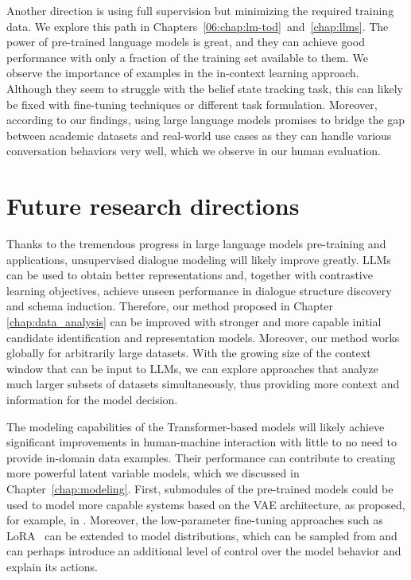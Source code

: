 Another direction is using full supervision but minimizing the required training data.
We explore this path in Chapters~\ref{06:chap:lm-tod}~and~\ref{chap:llms}.
The power of pre-trained language models is great, and they can achieve good performance with only a fraction of the training set available to them.
We observe the importance of examples in the in-context learning approach.
Although they seem to struggle with the belief state tracking task, this can likely be fixed with fine-tuning techniques or different task formulation.
Moreover, according to our findings, using large language models promises to bridge the gap between academic datasets and real-world use cases as they can handle various conversation behaviors very well, which we observe in our human evaluation.

\section{Future research directions}
Thanks to the tremendous progress in large language models pre-training and applications, unsupervised dialogue modeling will likely improve greatly.
LLMs can be used to obtain better representations and, together with contrastive learning objectives, achieve unseen performance in dialogue structure discovery and schema induction.
Therefore, our method proposed in Chapter \ref{chap:data_analysis} can be improved with stronger and more capable initial candidate identification and representation models.
Moreover, our method works globally for arbitrarily large datasets.
With the growing size of the context window that can be input to LLMs, we can explore approaches that analyze much larger subsets of datasets simultaneously, thus providing more context and information for the model decision.


The modeling capabilities of the Transformer-based models will likely achieve significant improvements in human-machine interaction with little to no need to provide in-domain data examples.
Their performance can contribute to creating more powerful latent variable models, which we discussed in Chapter~\ref{chap:modeling}.
First, submodules of the pre-trained models could be used to model more capable systems based on the VAE architecture, as proposed, for example, in \citet{li-etal-2020-optimus}.
Moreover, the low-parameter fine-tuning approaches such as LoRA~\citep{hu2021lora} can be extended to model distributions, which can be sampled from and can perhaps introduce an additional level of control over the model behavior and explain its actions.

